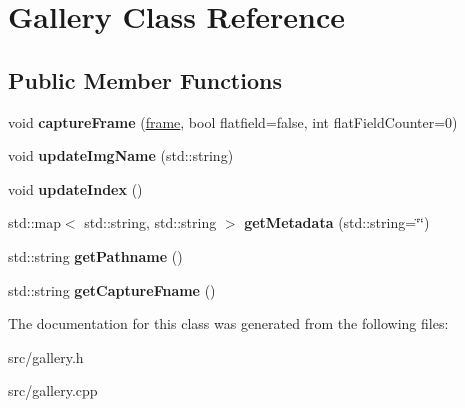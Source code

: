 \hypertarget{class_gallery}{}\section{Gallery Class Reference}
\label{class_gallery}
\subsection*{Public Member Functions}
\begin{DoxyCompactItemize}
\item 
void {\bfseries capture\+Frame} (\hyperlink{classframe}{frame}, bool flatfield=false, int flat\+Field\+Counter=0)\hypertarget{class_gallery_a72a65b916b7fb06b753a69c404e66987}{}\label{class_gallery_a72a65b916b7fb06b753a69c404e66987}

\item 
void {\bfseries update\+Img\+Name} (std\+::string)\hypertarget{class_gallery_a5b4879daecb8808cfaf3f8f99c76d348}{}\label{class_gallery_a5b4879daecb8808cfaf3f8f99c76d348}

\item 
void {\bfseries update\+Index} ()\hypertarget{class_gallery_a2893fa1b10fe346ac865cf8da0d5f08d}{}\label{class_gallery_a2893fa1b10fe346ac865cf8da0d5f08d}

\item 
std\+::map$<$ std\+::string, std\+::string $>$ {\bfseries get\+Metadata} (std\+::string=\char`\"{}\char`\"{})\hypertarget{class_gallery_a2f615f26aa87600361856273d2e129b2}{}\label{class_gallery_a2f615f26aa87600361856273d2e129b2}

\item 
std\+::string {\bfseries get\+Pathname} ()\hypertarget{class_gallery_a219722e7c6db614fad9eb055d2d79036}{}\label{class_gallery_a219722e7c6db614fad9eb055d2d79036}

\item 
std\+::string {\bfseries get\+Capture\+Fname} ()\hypertarget{class_gallery_a5c5b3fc09eb83462d9be010a758de18e}{}\label{class_gallery_a5c5b3fc09eb83462d9be010a758de18e}

\end{DoxyCompactItemize}


The documentation for this class was generated from the following files\+:\begin{DoxyCompactItemize}
\item 
src/gallery.\+h\item 
src/gallery.\+cpp\end{DoxyCompactItemize}
